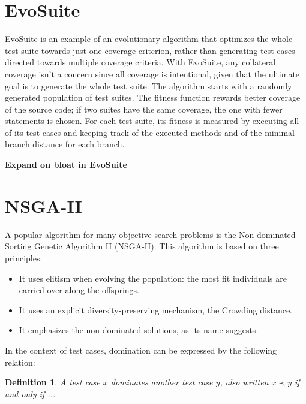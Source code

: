 \section{EvoSuite}
EvoSuite is an example of an evolutionary algorithm that optimizes the whole test suite towards just one coverage criterion, rather than generating test cases directed towards multiple coverage criteria.
With EvoSuite, any collateral coverage isn't a concern since all coverage is intentional, given that the ultimate goal is to generate the whole test suite.
The algorithm starts with a randomly generated population of test suites.
The fitness function rewards better coverage of the source code; if two suites have the same coverage, the one with fewer statements is chosen. For each test suite, its fitness is measured by executing all of its test cases and keeping track of the executed methods and of the minimal branch distance for each branch.

\textbf{Expand on bloat in EvoSuite}





\section{NSGA-II}
A popular algorithm for many-objective search problems is the Non-dominated Sorting Genetic Algorithm II (NSGA-II). This algorithm is based on three principles:

\begin{itemize}
    \item It uses elitism when evolving the population: the most fit individuals are carried over along the offsprings.
    \item It uses an explicit diversity-preserving mechanism, the Crowding distance.
    \item It emphasizes the non-dominated solutions, as its name suggests.
\end{itemize}

In the context of test cases, domination can be expressed by the following relation:
\newtheorem{dominance}{Definition}
\begin{dominance}
    A test case $ x $ dominates another test case $ y $, also written $ x  \prec y $ if and only if ...
\end{dominance}

